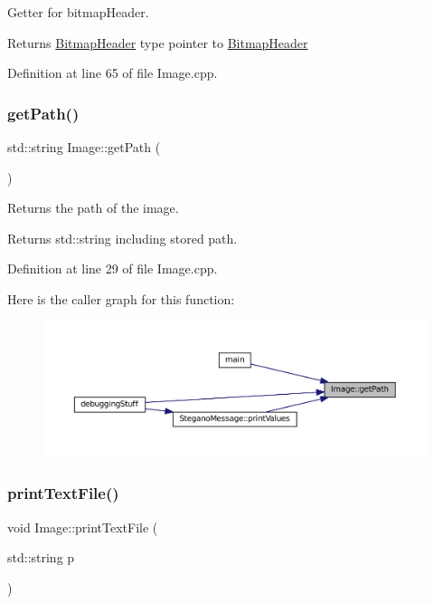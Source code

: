 Getter for bitmap\+Header. 

\begin{DoxyReturn}{Returns}
\mbox{\hyperlink{classBitmapHeader}{Bitmap\+Header}} type pointer to \mbox{\hyperlink{classBitmapHeader}{Bitmap\+Header}} 
\end{DoxyReturn}


Definition at line 65 of file Image.\+cpp.

\mbox{\label{classImage_a885989eb723cb0a1fc0555c7e8de817e}} 
\subsubsection{\texorpdfstring{getPath()}{getPath()}}
{\footnotesize\ttfamily std\+::string Image\+::get\+Path (\begin{DoxyParamCaption}{ }\end{DoxyParamCaption})}



Returns the path of the image. 

\begin{DoxyReturn}{Returns}
std\+::string including stored path. 
\end{DoxyReturn}


Definition at line 29 of file Image.\+cpp.

Here is the caller graph for this function\+:
\nopagebreak
\begin{figure}[H]
\begin{center}
\leavevmode
\includegraphics[width=350pt]{classImage_a885989eb723cb0a1fc0555c7e8de817e_icgraph}
\end{center}
\end{figure}
\mbox{\label{classImage_a3bde1df035fc794c268aab430bbafde0}} 
\subsubsection{\texorpdfstring{printTextFile()}{printTextFile()}}
{\footnotesize\ttfamily void Image\+::print\+Text\+File (\begin{DoxyParamCaption}\item[{std\+::string}]{p }\end{DoxyParamCaption})}



